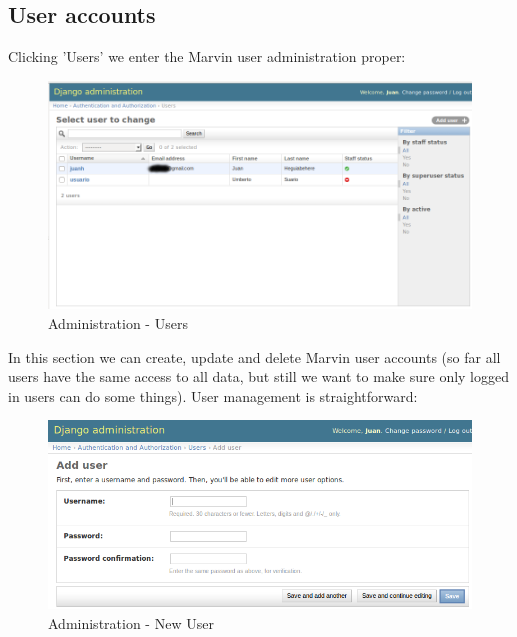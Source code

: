 \documentclass[11pt]{article}
\begin{document}
\subsection{User accounts}
Clicking 'Users' we enter the Marvin user administration proper:
\begin{figure}[H]
\begin{center}
\includegraphics[width=\textwidth]{graphics/marvin2.png}
\caption{Administration - Users} \label{adminus}
\end{center}
\end{figure}

In this section we can create, update and delete Marvin user accounts (so far all users have the same access to all data, but still we want to make sure only logged in users can do some things). User management is straightforward:

\begin{figure}[H]
\begin{center}
\includegraphics[width=\textwidth]{graphics/marvin4.png}
\caption{Administration - New User} \label{altaus}
\end{center}
\end{figure}
\end{document}
